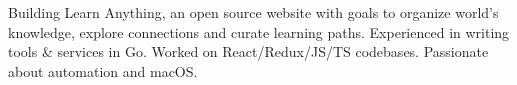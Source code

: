 
\begin{cvparagraph}
  Building Learn Anything, an open source website with goals to organize world's knowledge, explore connections and curate learning paths. Experienced in writing tools & services in Go. Worked on React/Redux/JS/TS codebases. Passionate about automation and macOS.
\end{cvparagraph}
